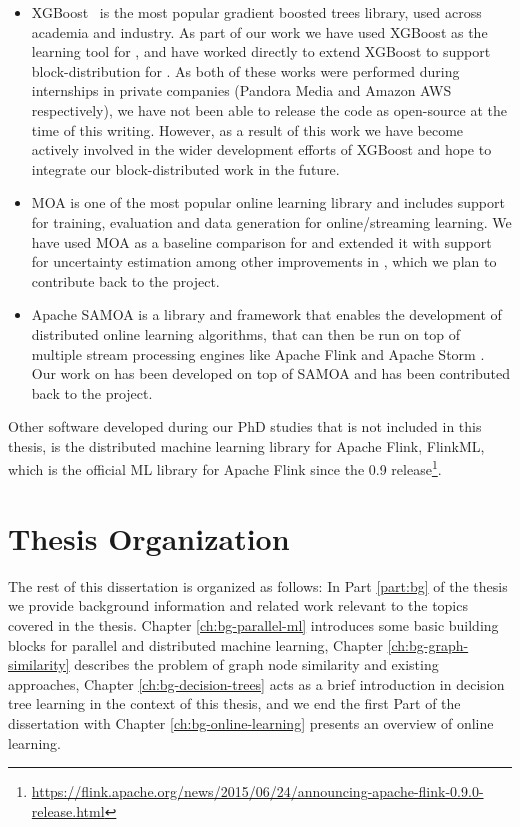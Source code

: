 \begin{itemize}
	\item XGBoost~\cite{xgboost} is the most popular gradient boosted trees library,
	used across academia and industry. As part of our work we have used XGBoost as the
	learning tool for \sessionlength, and have worked directly to extend XGBoost to
	support block-distribution
	for \blockgbt. As both of these works were performed during internships in private
	companies (Pandora Media and Amazon AWS respectively), we have not been able to release
	the code as open-source at the time of this writing.
	However, as a result of this work we have become actively involved in the wider
	development efforts of XGBoost and hope to integrate our block-distributed
	work in the future.
	\item MOA \cite{moa-book} is one of the most popular online learning library and includes
	support for training, evaluation and data generation for online/streaming learning.
	We have used MOA as a baseline comparison for \boostvht and extended it with
	support for uncertainty estimation among other improvements in \uncertaintrees,
	which we plan to contribute back to the project.
	\item Apache SAMOA \cite{samoa} is a library and framework that enables the development
	of distributed online learning algorithms, that can then be run on top of multiple
	stream processing engines like Apache Flink \cite{flink} and Apache Storm \cite{storm}.
	Our work on \boostvht has been developed on top of SAMOA and has been contributed back
	to the project.
\end{itemize}

Other software developed during our PhD studies that is not included in this
thesis, is the distributed machine learning library for
Apache Flink, FlinkML, which is the official ML library for Apache Flink
since the 0.9 release\footnote{\url{https://flink.apache.org/news/2015/06/24/announcing-apache-flink-0.9.0-release.html}}.

\section{Thesis Organization}

The rest of this dissertation is organized as follows:
In Part \ref{part:bg} of the thesis we provide background information and
related work relevant to the topics covered in the thesis. Chapter
\ref{ch:bg-parallel-ml} introduces some basic building blocks
for parallel and distributed machine learning, Chapter \ref{ch:bg-graph-similarity} describes the problem
of graph node similarity and existing approaches, Chapter \ref{ch:bg-decision-trees} acts as a brief introduction
in decision tree learning in the context of this thesis, and we end the first Part of the
dissertation with Chapter \ref{ch:bg-online-learning} presents an overview of online learning.

